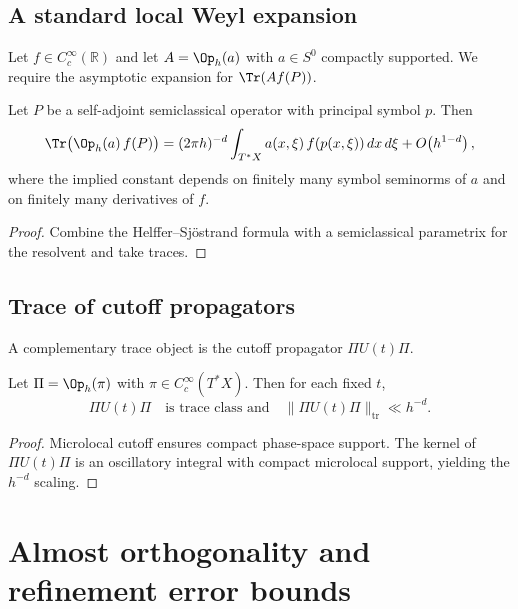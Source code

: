 \subsection{A standard local Weyl expansion}
\label{subsec:C.local-weyl-expansion}

Let $f\in C_c^\infty(\mathbb{R})$ and let $A=\Op_h(a)$ with $a\in S^0$ compactly supported.
We require the asymptotic expansion for $\Tr(A f(P))$.

\begin{theorem}
\label{thm:C.local-weyl}
Let $P$ be a self-adjoint semiclassical operator with principal symbol $p$.
Then
\begin{equation}
\label{eq:C.local-weyl}
\Tr\bigl(\Op_h(a)\,f(P)\bigr)
=
(2\pi h)^{-d}
\int_{T^\ast X} a(x,\xi)\,f(p(x,\xi))\,dx\,d\xi
+
O\!\left(h^{1-d}\right),
\end{equation}
where the implied constant depends on finitely many symbol seminorms of $a$ and on finitely many derivatives of $f$.
\end{theorem}

\begin{proof}
Combine the Helffer--Sj\"ostrand formula with a semiclassical parametrix for the resolvent and take traces.
\end{proof}

\subsection{Trace of cutoff propagators}
\label{subsec:C.trace-propagator}

A complementary trace object is the cutoff propagator $\Pi U(t)\Pi$.

\begin{proposition}
\label{prop:C.cutoff-propagator-trace}
Let $\Pi=\Op_h(\pi)$ with $\pi\in C_c^\infty(T^\ast X)$.
Then for each fixed $t$,
\[
\Pi U(t)\Pi
\quad\text{is trace class and}\quad
\|\Pi U(t)\Pi\|_{\mathrm{tr}}
\ll
h^{-d}.
\]
\end{proposition}

\begin{proof}
Microlocal cutoff ensures compact phase-space support.  The kernel of $\Pi U(t)\Pi$ is an oscillatory integral with
compact microlocal support, yielding the $h^{-d}$ scaling.
\end{proof}

\section{Almost orthogonality and refinement error bounds}
\label{sec:C.almost-orthogonality}

